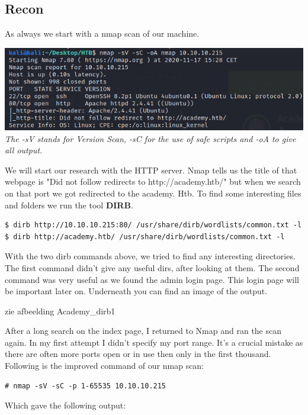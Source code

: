 \documentclass[../main.tex]{subfiles}
\begin{document}
\subsection{Recon}
As always we start with a nmap scan of our machine.

\includegraphics[width=\linewidth]{images/Robbe/Academy_scanning1.png}
\textit{The -sV stands for Version Scan, -sC for the use of safe scripts and -oA to give all output.}

We will start our research with the HTTP server. Nmap tells us the title of that webpage is "Did not follow redirects to http://academy.htb/" but when we search on that port we got redirected to the academy. Htb. To find some interesting files and folders we run the tool \textbf{DIRB}.

\begin{lstlisting}
$ dirb http://10.10.10.215:80/ /usr/share/dirb/wordlists/common.txt -l
$ dirb http://academy.htb/ /usr/share/dirb/wordlists/common.txt -l
\end{lstlisting}

With the two dirb commands above, we tried to find any interesting directories. The first command didn't give any useful dirs, after looking at them. The second command was very useful as we found the admin login page. This login page will be important later on. Underneath you can find an image of the output. 

zie afbeelding Academy\_dirb1

After a long search on the index page, I returned to Nmap and ran the scan again. In my first attempt I didn't specify my port range. It's a crucial mistake as there are often more ports open or in use then only in the first thousand. Following is the improved command of our nmap scan:

\begin{lstlisting}
# nmap -sV -sC -p 1-65535 10.10.10.215
\end{lstlisting}
Which gave the following output:
\end{document}
